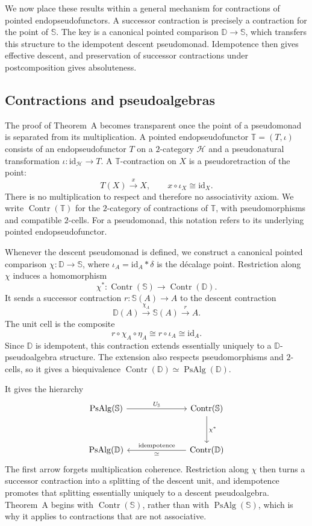 \documentclass[11pt,a4paper]{article}
\numberwithin{equation}{section}
\theoremstyle{definition}
\theoremstyle{remark}
\newcommand{\id}{\mathrm{id}}
\newcommand{\Hcat}{\mathcal H}
\newcommand{\Dmon}{\mathbb D}
\newcommand{\Smon}{\mathbb S}
\newcommand{\Contr}{\operatorname{Contr}}
\newcommand{\PsAlg}{\operatorname{PsAlg}}
\begin{document}
We now place these results within a general mechanism for contractions
of pointed endopseudofunctors. A successor contraction is precisely a
contraction for the point of \(\Smon\).
The key is a canonical pointed comparison \(\Dmon\to\Smon\),
which transfers this structure to the idempotent descent pseudomonad.
Idempotence then gives effective descent, and preservation of
successor contractions under postcomposition gives absoluteness.

\subsection*{Contractions and pseudoalgebras}

The proof of Theorem~A becomes transparent once the point of a
pseudomonad is separated from its multiplication. A pointed
endopseudofunctor \(\mathbb T=(T,\iota)\) consists of an endopseudofunctor
\(T\) on a $2$-category $\Hcat$ and a pseudonatural transformation
\(\iota\colon\id_{\Hcat} \to T\). A \(\mathbb T\)-contraction on
\(X\) is a pseudoretraction of the point:
\[
T(X)\xrightarrow{x}X,
\qquad
x\circ\iota_X\cong\id_X.
\]
There is no multiplication to respect and therefore no associativity
axiom. We write \(\Contr(\mathbb T)\) for the \(2\)-category of
contractions of \(\mathbb T\), with pseudomorphisms and
compatible \(2\)-cells. For a pseudomonad, this notation refers to its
underlying pointed endopseudofunctor.

Whenever the descent pseudomonad is defined, we construct a
canonical pointed comparison \(\chi\colon\Dmon\to\Smon\), where
\(\iota_A=\id_A\ast\delta\) is the d\'ecalage point.
Restriction along \(\chi\) induces a homomorphism
\[
\chi^*\colon\Contr(\Smon)\longrightarrow\Contr(\Dmon).
\]
It sends a successor contraction \(r\colon\Smon(A)\to A\) to
the descent contraction
\[
\Dmon(A)\xrightarrow{\chi_A}\Smon(A)\xrightarrow{r}A.
\]
The unit cell is the composite
\[
r\circ\chi_A\circ\eta_A
\cong r\circ\iota_A
\cong\id_A.
\]
Since \(\Dmon\) is idempotent, this contraction extends
essentially uniquely to a \(\Dmon\)-pseudoalgebra structure.
The extension also respects pseudomorphisms and \(2\)-cells, so
it gives a biequivalence
\(\Contr(\Dmon)\simeq\PsAlg(\Dmon)\).

It gives the hierarchy
\[
\begin{tikzcd}[column sep=7.0em,row sep=3.2em]
  \PsAlg(\Smon) \ar[r,"U_{\Smon}"]
  & \Contr(\Smon) \ar[d,"\chi^*"]
  \\
  \PsAlg(\Dmon)
  & \Contr(\Dmon) \ar[l,"\text{idempotence}"',"\simeq"]
\end{tikzcd}
\]
The first arrow forgets multiplication coherence. Restriction along
\(\chi\) then turns a successor contraction into a splitting of the
descent unit, and idempotence promotes that splitting essentially
uniquely to a descent pseudoalgebra. Theorem~A begins with
\(\Contr(\Smon)\), rather than with \(\PsAlg(\Smon)\), which is why it
applies to contractions that are not associative.
\end{document}
